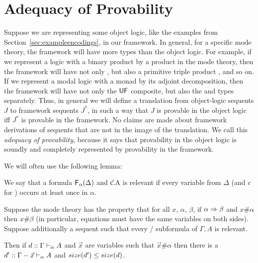 
\section{Adequacy of Provability}
\label{sec:adequacy-long}

Suppose we are representing some object logic, like the examples from
Section~\ref{sec:exampleencodings}, in our framework.  In general, for a
specific mode theory, the framework will have more types than the object
logic.  For example, if we represent a logic with a binary product by a
product in the mode theory, then the framework will have not only , but also a primitive triple product , and so on.  If we represent a modal logic
with a monad by its adjoint decomposition, then the framework will have
not only the $\mathsf{U} \mathsf{F}$ composite, but also the \Usymb\/ and
\Fsymb\/ types separately.  Thus, in general we will define a
translation from object-logic sequents $J$ to framework sequents $J^*$,
in such a way that $J$ is provable in the object logic iff $J^*$ is
provable in the framework.  No claims are made about framework
derivations of sequents that are not in the image of the translation.
We call this \emph{adequacy of provability}, because it says that
provability in the object logic is soundly and completely represented by
provability in the framework.

We will often use the following lemma:  

\begin{lemma} \label{lem:0-use-strengthening}
We say that a formula $\mathsf{F}_{\alpha}(\Delta)$ and \U{c.\alpha}{\Delta}{A}
is relevant if every variable from $\Delta$ (and $c$ for \Usymb) occurs
at least once in $\alpha$.

Suppose the mode theory has the property that for all $x$, $\alpha$,
$\beta$, if $\alpha \Rightarrow \beta$ and $x \# \alpha$ then $x \# \beta$ (in
particular, equations must have the same variables on both sides).
Suppose additionally a sequent  such that every
\Fsymb/\Usymb\/ subformula of $\Gamma,A$ is relevant.

Then if $d :: \Gamma \vdash_{\alpha} A$ and $\vec{x}$ are variables such
that $\vec{x} \# \alpha$ then there is a $d' ::
\Gamma-\vec{x} \vdash_{\alpha} A$ and $size(d') \le size(d)$.
\end{lemma}


